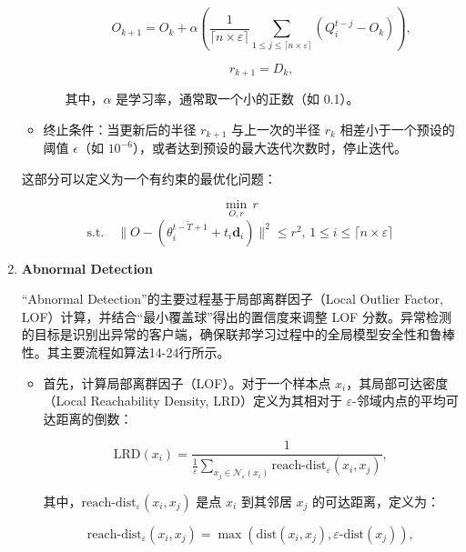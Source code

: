 \documentclass[lettersize,journal]{IEEEtran}
\begin{document}
\begin{enumerate}
\begin{itemize}
\begin{itemize}
        \begin{equation}
        O_{k+1} = O_k + \alpha \left(\frac{1}{\lceil n\times \varepsilon\rceil} \sum_{1\leq j\leq \lceil n\times \varepsilon\rceil} (Q_{i}^{t-j} - O_k)\right),
        \end{equation}

        \begin{equation}
        r_{k+1} = D_k,
        \end{equation}

        其中，\( \alpha \) 是学习率，通常取一个小的正数（如 0.1）。
    \end{itemize}
    \item 终止条件：当更新后的半径 \( r_{k+1} \) 与上一次的半径 \( r_k \) 相差小于一个预设的阈值 \( \epsilon \)（如 \( 10^{-6} \)），或者达到预设的最大迭代次数时，停止迭代。
\end{itemize}

这部分可以定义为一个有约束的最优化问题：

\begin{equation}
\min_{O, r} \, r 
\end{equation}
$$
\text{s.t.} \quad \| O - (\overline{\theta_{i}^{t-T+1}} + t_i \mathbf{d}_i) \|^2 \leq r^2, \, 1\leq i\leq \lceil n \times \varepsilon \rceil
$$

\item \textbf{Abnormal Detection}

“Abnormal Detection”的主要过程基于局部离群因子（Local Outlier Factor, LOF）计算，并结合“最小覆盖球”得出的置信度来调整 LOF 分数。异常检测的目标是识别出异常的客户端，确保联邦学习过程中的全局模型安全性和鲁棒性。其主要流程如算法14-24行所示。

\begin{itemize}
    \item 首先，计算局部离群因子（LOF）。对于一个样本点 \(x_i\)，其局部可达密度（Local Reachability Density, LRD）定义为其相对于 \(\varepsilon\)-邻域内点的平均可达距离的倒数：

    \begin{equation}
    \text{LRD}(x_i) = \frac{1}{\frac{1}{\varepsilon} \sum_{x_j \in \mathcal{N}_\varepsilon(x_i)} \text{reach-dist}_\varepsilon(x_i, x_j)},
    \end{equation}

    其中，\(\text{reach-dist}_\varepsilon(x_i, x_j)\) 是点 \(x_i\) 到其邻居 \(x_j\) 的可达距离，定义为：

    \begin{equation}
    \text{reach-dist}_\varepsilon(x_i, x_j) = \max(\text{dist}(x_i, x_j), \varepsilon\text{-dist}(x_j)),
    \end{equation}


\end{itemize}
\end{enumerate}
\end{document}
